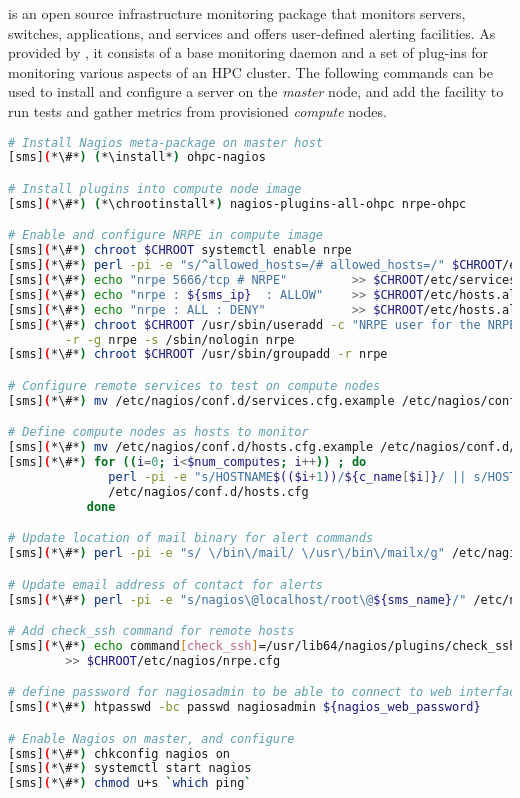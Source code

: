 \Nagios{} is an open source infrastructure monitoring package that monitors
servers, switches, applications, and services and offers user-defined alerting
facilities. As provided by \OHPC{}, it consists of a base monitoring daemon and
a set of plug-ins for monitoring various aspects of an HPC cluster. The
following commands can be used to install and configure a \Nagios{} server on the {\em
master} node, and add the facility to run tests and gather metrics from
provisioned {\em compute} nodes.

\begin{lstlisting}[language=bash,keywords={},upquote=true]
# Install Nagios meta-package on master host
[sms](*\#*) (*\install*) ohpc-nagios

# Install plugins into compute node image
[sms](*\#*) (*\chrootinstall*) nagios-plugins-all-ohpc nrpe-ohpc

# Enable and configure NRPE in compute image
[sms](*\#*) chroot $CHROOT systemctl enable nrpe
[sms](*\#*) perl -pi -e "s/^allowed_hosts=/# allowed_hosts=/" $CHROOT/etc/nagios/nrpe.cfg
[sms](*\#*) echo "nrpe 5666/tcp # NRPE"         >> $CHROOT/etc/services
[sms](*\#*) echo "nrpe : ${sms_ip}  : ALLOW"    >> $CHROOT/etc/hosts.allow
[sms](*\#*) echo "nrpe : ALL : DENY"            >> $CHROOT/etc/hosts.allow
[sms](*\#*) chroot $CHROOT /usr/sbin/useradd -c "NRPE user for the NRPE service" -d /var/run/nrpe \
        -r -g nrpe -s /sbin/nologin nrpe
[sms](*\#*) chroot $CHROOT /usr/sbin/groupadd -r nrpe

# Configure remote services to test on compute nodes
[sms](*\#*) mv /etc/nagios/conf.d/services.cfg.example /etc/nagios/conf.d/services.cfg

# Define compute nodes as hosts to monitor
[sms](*\#*) mv /etc/nagios/conf.d/hosts.cfg.example /etc/nagios/conf.d/hosts.cfg
[sms](*\#*) for ((i=0; i<$num_computes; i++)) ; do
              perl -pi -e "s/HOSTNAME$(($i+1))/${c_name[$i]}/ || s/HOST$(($i+1))_IP/${c_ip[$i]}/" \
              /etc/nagios/conf.d/hosts.cfg
           done

# Update location of mail binary for alert commands
[sms](*\#*) perl -pi -e "s/ \/bin\/mail/ \/usr\/bin\/mailx/g" /etc/nagios/objects/commands.cfg

# Update email address of contact for alerts
[sms](*\#*) perl -pi -e "s/nagios\@localhost/root\@${sms_name}/" /etc/nagios/objects/contacts.cfg

# Add check_ssh command for remote hosts
[sms](*\#*) echo command[check_ssh]=/usr/lib64/nagios/plugins/check_ssh localhost \
        >> $CHROOT/etc/nagios/nrpe.cfg

# define password for nagiosadmin to be able to connect to web interface
[sms](*\#*) htpasswd -bc passwd nagiosadmin ${nagios_web_password}

# Enable Nagios on master, and configure
[sms](*\#*) chkconfig nagios on
[sms](*\#*) systemctl start nagios
[sms](*\#*) chmod u+s `which ping`
\end{lstlisting}


